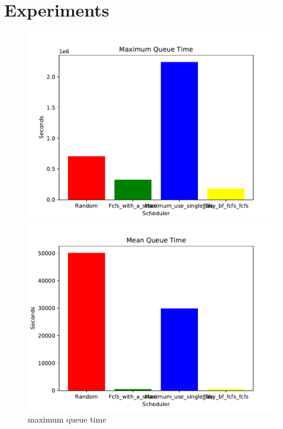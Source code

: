 \documentclass[a4paper]{article}
\begin{document}
\section{Experiments}
\begin{figure}[H] 
  \label{ fig7} 
  \begin{minipage}[b]{0.5\linewidth}
    \centering
    \includegraphics[width=1.11\linewidth]{MBSS/plot/2021-05-23_Maximum_queue_time.pdf} 
    \caption{maximum queue time} 
    \vspace{4ex}
  \end{minipage}%
  \begin{minipage}[b]{0.5\linewidth}
    \centering
    \includegraphics[width=1.11\linewidth]{MBSS/plot/2021-05-23_Mean_queue_time.pdf} 

\end{minipage}
\end{figure}
\end{document}
